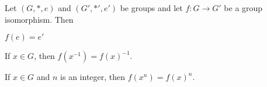   Let $(G, *, e)$ and $(G', *', e')$ be groups 
  and let $f: G \rightarrow G'$ be a group isomorphism.
  Then
  \begin{myenum}
  \item $f(e) = e'$
  \item If $x \in G$, then $f(x^{-1}) = f(x)^{-1}$.
  \item If $x \in G$ and $n$ is an integer,
        then $f(x^n) = f(x)^{n}$.
  \end{myenum}
